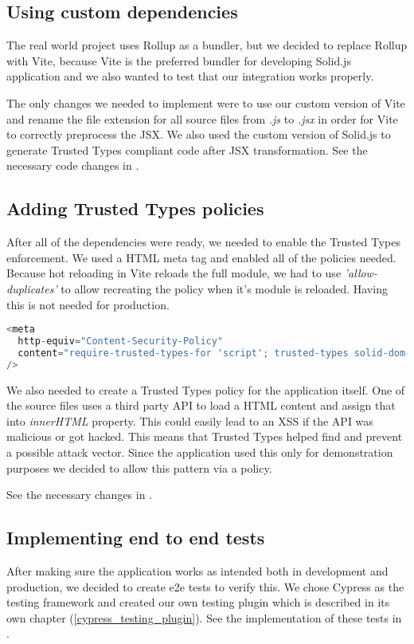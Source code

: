 \subsection{Using custom dependencies}

The real world project uses Rollup as a bundler, but we decided to replace Rollup with Vite,
because Vite is the preferred bundler for developing Solid.js application and we also wanted to test
that our integration works properly.

The only changes we needed to implement were to use our custom version of Vite and rename the file
extension for all source files from \emph{.js} to \emph{.jsx} in order for Vite to correctly
preprocess the JSX. We also used the custom version of Solid.js to generate Trusted Types compliant
code after JSX transformation. See the necessary code changes in
\cite{solid_realworld_project:vite}.

\subsection{Adding Trusted Types policies}

After all of the dependencies were ready, we needed to enable the Trusted Types enforcement. We used
a HTML meta tag and enabled all of the policies needed. Because hot reloading in Vite reloads the
full module, we had to use \emph{'allow-duplicates'} to allow recreating the policy when it's
module is reloaded. Having this is not needed for production.

\bigskip
\begin{lstlisting}[language=JavaScript, caption=Creation of style elements using \emph{innerHTML} in Vite \cite{commit_vite_inner_html_styles}]
<meta
  http-equiv="Content-Security-Policy"
  content="require-trusted-types-for 'script'; trusted-types solid-dom-expressions trusted-article vite-overlay 'allow-duplicates';"
/>
\end{lstlisting}

We also needed to create a Trusted Types policy for the application itself. One of the source files
uses a third party API to load a HTML content and assign that into \emph{innerHTML} property. This
could easily lead to an XSS if the API was malicious or got hacked. This means that Trusted Types
helped find and prevent a possible attack vector. Since the application used this only for
demonstration purposes we decided to allow this pattern via a policy.

See the necessary changes in \cite{solid_realworld_project:tt_policy}.

\subsection{Implementing end to end tests}

After making sure the application works as intended both in development and production, we decided
to create e2e tests to verify this. We chose Cypress as the testing framework and created our own
testing plugin which is described in its own chapter (\ref{cypress_testing_plugin}). See the
implementation of these tests in \cite{solid_realworld_project:tests}.
